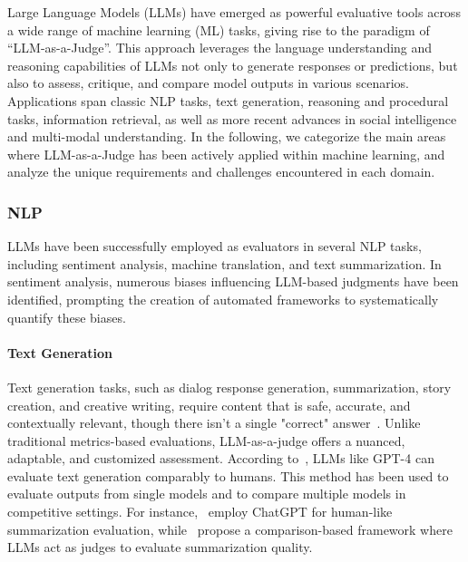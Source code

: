\documentclass[acmsmall,screen]{acmart}
\begin{document}
Large Language Models (LLMs) have emerged as powerful evaluative tools across a wide range of machine learning (ML) tasks, giving rise to the paradigm of ``LLM-as-a-Judge''. This approach leverages the language understanding and reasoning capabilities of LLMs not only to generate responses or predictions, but also to assess, critique, and compare model outputs in various scenarios. Applications span classic NLP tasks, text generation, reasoning and procedural tasks, information retrieval, as well as more recent advances in social intelligence and multi-modal understanding. In the following, we categorize the main areas where LLM-as-a-Judge has been actively applied within machine learning, and analyze the unique requirements and challenges encountered in each domain.


\subsubsection{\textbf{NLP}} LLMs have been successfully employed as evaluators in several NLP tasks, including sentiment analysis, machine translation, and text summarization. In sentiment analysis, numerous biases influencing LLM-based judgments have been identified, prompting the creation of automated frameworks to systematically quantify these biases. 


\paragraph{\textbf{Text Generation}} 
Text generation tasks, such as dialog response generation, summarization, story creation, and creative writing, require content that is safe, accurate, and contextually relevant, though there isn't a single "correct" answer~\cite{badshah2024reference, bermejo2024enhancing}. Unlike traditional metrics-based evaluations, LLM-as-a-judge offers a nuanced, adaptable, and customized assessment. According to~\citet{nips_llm_as_a_judge}, LLMs like GPT-4 can evaluate text generation comparably to humans. This method has been used to evaluate outputs from single models and to compare multiple models in competitive settings. For instance,~\citet{human_like_summarization} employ ChatGPT for human-like summarization evaluation, while~\citet{wu2023large} propose a comparison-based framework where LLMs act as judges to evaluate summarization quality.
\end{document}
